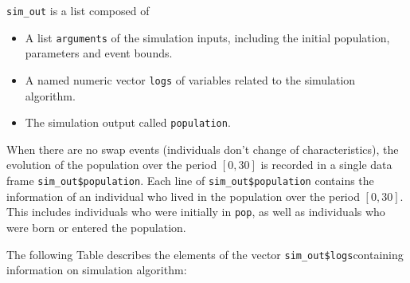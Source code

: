 \texttt{sim\_out} is a list composed of

\begin{itemize}
\tightlist
\item
  A list \texttt{arguments} of the simulation inputs, including the initial population, parameters and event bounds.
\item
  A named numeric vector \texttt{logs} of variables related to the simulation algorithm.
\item
  The simulation output called \texttt{population}.
\end{itemize}

When there are no swap events (individuals don't change of characteristics), the evolution of the population over the period \([0,30]\) is recorded in a single data frame \texttt{sim\_out\$population}.
Each line of \texttt{sim\_out\$population} contains the information of an individual who lived in the population over the period \([0,30]\). This includes individuals who were initially in \texttt{pop}, as well as individuals who were born or entered the population.

\begin{Shaded}
\begin{Highlighting}[]
\SpecialCharTok{$}
\end{Highlighting}
\end{Shaded}

The following Table describes the elements of the vector \texttt{sim\_out\$logs}containing information on simulation algorithm:

